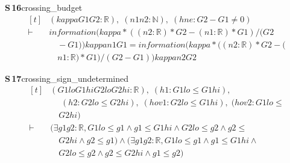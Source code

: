 \documentclass[conference]{IEEEtran}
\theoremstyle{definition}
\newcommand{\lean}[1]{\textsf{\footnotesize #1}}
\begin{document}
\noindent\textbf{S\,16}\quad\lean{crossing\_budget}
{\footnotesize\[ \begin{aligned}[t]
&(\mathit{kappa} \mathit{G1} \mathit{G2} : \mathbb{R} ),\; (\mathit{n1} \mathit{n2} : \mathbb{N} ),\; (\mathit{hne} : \mathit{G2} - \mathit{G1} \neq 0)\\
\vdash\;&\mathit{information} (\mathit{kappa} * ((\mathit{n2} : \mathbb{R} ) * \mathit{G2} - (\mathit{n1} : \mathbb{R} ) * \mathit{G1}) / (\mathit{G2}\\
&\quad - \mathit{G1})) \mathit{kappa} \mathit{n1} \mathit{G1} = \mathit{information} (\mathit{kappa} * ((\mathit{n2} : \mathbb{R} ) * \mathit{G2} - (\\
&\quad \mathit{n1} : \mathbb{R} ) * \mathit{G1}) / (\mathit{G2} - \mathit{G1})) \mathit{kappa} \mathit{n2} \mathit{G2}
\end{aligned} \]}

\noindent\textbf{S\,17}\quad\lean{crossing\_sign\_undetermined}
{\footnotesize\[ \begin{aligned}[t]
&(\mathit{G1lo} \mathit{G1hi} \mathit{G2lo} \mathit{G2hi} : \mathbb{R} ),\; (\mathit{h1} : \mathit{G1lo} \leq \mathit{G1hi}),\\
&\quad \; (\mathit{h2} : \mathit{G2lo} \leq \mathit{G2hi}),\; (\mathit{hov1} : \mathit{G2lo} \leq \mathit{G1hi}),\; (\mathit{hov2} : \mathit{G1lo} \leq\\
&\quad \mathit{G2hi})\\
\vdash\;&(\exists \mathit{g1} \mathit{g2} : \mathbb{R} , \mathit{G1lo} \leq \mathit{g1} \wedge \mathit{g1} \leq \mathit{G1hi} \wedge \mathit{G2lo} \leq \mathit{g2} \wedge \mathit{g2} \leq\\
&\quad \mathit{G2hi} \wedge \mathit{g2} \leq \mathit{g1}) \wedge (\exists \mathit{g1} \mathit{g2} : \mathbb{R} , \mathit{G1lo} \leq \mathit{g1} \wedge \mathit{g1} \leq \mathit{G1hi} \wedge\\
&\quad \mathit{G2lo} \leq \mathit{g2} \wedge \mathit{g2} \leq \mathit{G2hi} \wedge \mathit{g1} \leq \mathit{g2})
\end{aligned} \]}
\end{document}
